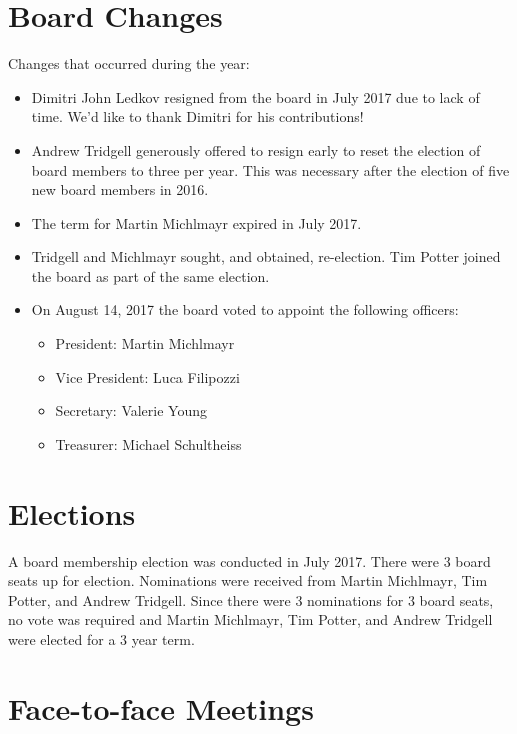 \documentclass[a4paper]{report}
\begin{document}
\section{Board Changes}

Changes that occurred during the year:

\begin{itemize}

\item Dimitri John Ledkov resigned from the board in July 2017 due to lack
of time.  We'd like to thank Dimitri for his contributions!

\item Andrew Tridgell generously offered to resign early to reset the
election of board members to three per year. This was necessary after the
election of five new board members in 2016.

\item The term for Martin Michlmayr expired in July 2017.

\item Tridgell and Michlmayr sought, and obtained, re-election.  Tim
Potter joined the board as part of the same election.

\item On August 14, 2017 the board voted to appoint the following
officers:

\begin{itemize}
\item President: Martin Michlmayr
\item Vice President: Luca Filipozzi
\item Secretary: Valerie Young
\item Treasurer: Michael Schultheiss
\end{itemize}

\end{itemize}

\section{Elections}

A board membership election was conducted in July 2017.  There were 3 board
seats up for election.  Nominations were received from Martin Michlmayr,
Tim Potter, and Andrew Tridgell.  Since there were 3 nominations for 3
board seats, no vote was required and Martin Michlmayr, Tim Potter, and
Andrew Tridgell were elected for a 3 year term.

\section{Face-to-face Meetings}
\end{document}
